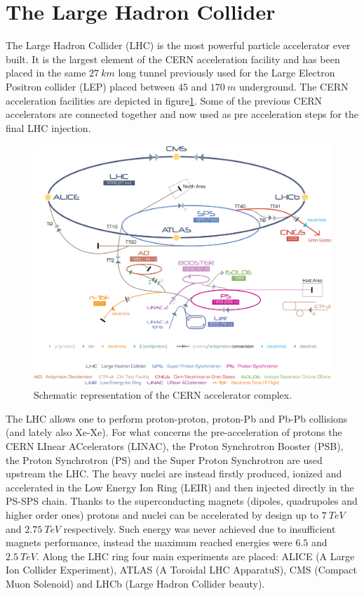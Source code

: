 \section{The Large Hadron Collider}
The Large Hadron Collider (LHC) is the most powerful particle accelerator ever built.
It is the largest element of the CERN acceleration facility and has been placed in the same $27\ km$ long tunnel previously used for the Large Electron Positron collider (LEP) placed between $45$ and $170\ m$ underground.
The CERN acceleration facilities are depicted in figure\ref{fig:accelerators}.
Some of the previous CERN accelerators are connected together and now used as pre acceleration steps for the final LHC injection.

\begin{figure}[!t]
\begin{center}
\includegraphics[width=\linewidth]{Chapters/Introduction/Figs/Cern-Accelerator-Complex.jpg}
\caption{Schematic representation of the CERN accelerator complex.}
\label{fig:accelerators}
\end{center}
\end{figure}

The LHC allows one to perform proton-proton, proton-Pb and Pb-Pb collisions (and lately also Xe-Xe).
For what concerns the pre-acceleration of protons the CERN LInear ACcelerators (LINAC), the Proton Synchrotron Booster (PSB), the Proton Synchrotron (PS) and the Super Proton Synchrotron are used upstream the LHC.
The heavy nuclei are instead firstly produced, ionized and accelerated in the Low Energy Ion Ring (LEIR) and then injected directly in the PS-SPS chain.
Thanks to the superconducting magnets (dipoles, quadrupoles and higher order ones) protons and nuclei can be accelerated by design up to $7\ TeV$ and $2.75\ TeV$ respectively.
Such energy was never achieved due to insufficient magnets performance, instead the maximum reached energies were $6.5$ and $2.5\ TeV$.
Along the LHC ring four main experiments are placed: ALICE (A Large Ion Collider Experiment),  ATLAS (A Toroidal LHC ApparatuS), CMS (Compact Muon Solenoid) and LHCb (Large Hadron Collider beauty).

